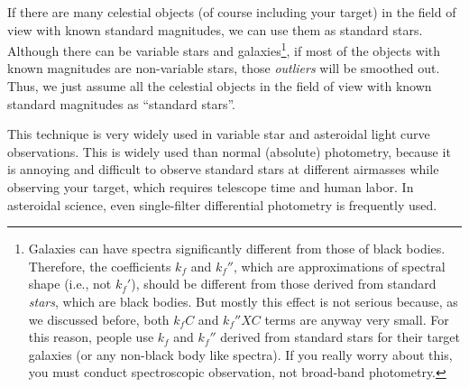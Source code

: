 If there are many celestial objects (of course including your target) in the field of view with known standard magnitudes, we can use them as standard stars. Although there can be variable stars and galaxies\footnote{Galaxies can have spectra significantly different from those of black bodies. Therefore, the coefficients $ k_f $ and $ k_f'' $, which are approximations of spectral shape (i.e., not $ k_f' $), should be different from those derived from standard \textit{stars}, which are black bodies. But mostly this effect is not serious because, as we discussed before, both $ k_f C $ and $ k_f'' X C $ terms are anyway very small. For this reason, people use $ k_f $ and $ k_f'' $ derived from standard stars for their target galaxies (or any non-black body like spectra). If you really worry about this, you must conduct spectroscopic observation, not broad-band photometry.}, if most of the objects with known magnitudes are non-variable stars, those \textit{outliers} will be smoothed out. Thus, we just assume all the celestial objects in the field of view with known standard magnitudes as ``standard stars''. 

This technique is very widely used in variable star and asteroidal light curve observations. This is widely used than normal (absolute) photometry, because it is annoying and difficult to observe standard stars at different airmasses while observing your target, which requires telescope time and human labor. In asteroidal science, even single-filter differential photometry is frequently used. 


